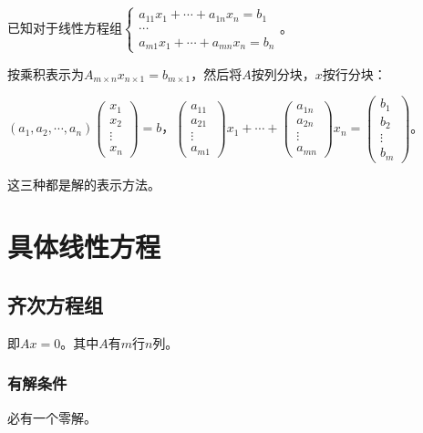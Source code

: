 \documentclass[UTF8, 12pt]{ctexart}
\begin{document}
已知对于线性方程组$\begin{cases}
    a_{11}x_1+\cdots+a_{1n}x_n=b_1 \\
    \cdots \\
    a_{m1}x_1+\cdots+a_{mn}x_n=b_n
\end{cases}$。

按乘积表示为$A_{m\times n}x_{n\times 1}=b_{m\times 1}$，然后将$A$按列分块，$x$按行分块：\medskip

$(a_1,a_2,\cdots,a_n)\left(\begin{array}{c}
    x_1 \\
    x_2 \\
    \vdots \\
    x_n
\end{array}\right)=b\text{，}\left(\begin{array}{c}
    a_{11} \\
    a_{21} \\
    \vdots \\
    a_{m1}
\end{array}\right)x_1+\cdots+\left(\begin{array}{c}
    a_{1n} \\
    a_{2n} \\
    \vdots \\
    a_{mn}
\end{array}\right)x_n=\left(\begin{array}{c}
    b_1 \\
    b_2 \\
    \vdots \\
    b_m
\end{array}\right)\text{。}$

这三种都是解的表示方法。

\section{具体线性方程}

\subsection{齐次方程组}

即$Ax=0$。其中$A$有$m$行$n$列。

\subsubsection{有解条件}

必有一个零解。
\end{document}
